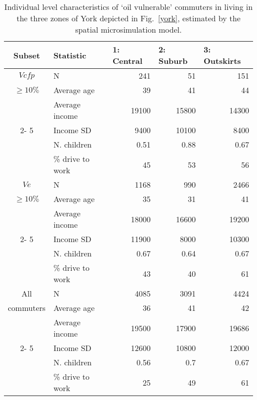 \begin{table}[htbp]
\caption[Individual level characteristics
of `oil vulnerable' commuters]{Individual level characteristics
of `oil vulnerable' commuters in living in the three zones of
York depicted in Fig.~\ref{york}, estimated by the spatial microsimulation
model.}
\begin{center}
\begin{tabular}{|c|l|r|r|r|}
\hline
Subset & Statistic & \multicolumn{1}{l|}{1: Central} & \multicolumn{1}{l|}{2:
Suburb} & \multicolumn{1}{l|}{3: Outskirts} \\ \hline
\multicolumn{ 1}{|c|}{$V{cfp}$} & N & 241 & 51 & 151 \\ \cline{ 2- 5}
\multicolumn{ 1}{|c|}{$\geq 10\%$} & Average age & 39 & 41 & 44 \\ \cline{ 2- 5}
\multicolumn{ 1}{|c|}{} & Average income & 19100 & 15800 & 14300 \\ \cline{ 2-
5}
\multicolumn{ 1}{|c|}{} & Income SD & 9400 & 10100 & 8400 \\ \cline{ 2- 5}
\multicolumn{ 1}{|c|}{} & N. children & 0.51 & 0.88 & 0.67 \\ \cline{ 2- 5}
\multicolumn{ 1}{|c|}{} & \% drive to work & 45 & 53 & 56 \\ \hline
\multicolumn{ 1}{|c|}{$V{e}$} & N & 1168 & 990 & 2466 \\ \cline{ 2- 5}
\multicolumn{ 1}{|c|}{$\geq 10\%$} & Average age & 35 & 31 & 41 \\ \cline{ 2- 5}
\multicolumn{ 1}{|c|}{} & Average income & 18000 & 16600 & 19200 \\ \cline{ 2-
5}
\multicolumn{ 1}{|c|}{} & Income SD & 11900 & 8000 & 10300 \\ \cline{ 2- 5}
\multicolumn{ 1}{|c|}{} & N. children & 0.67 & 0.64 & 0.67 \\ \cline{ 2- 5}
\multicolumn{ 1}{|c|}{} & \% drive to work & 43 & 40 & 61 \\ \hline
\multicolumn{ 1}{|c|}{All } & N & 4085 & 3091 & 4424 \\ \cline{ 2- 5}
\multicolumn{ 1}{|c|}{commuters} & Average age & 36 & 41 & 42 \\ \cline{ 2- 5}
\multicolumn{ 1}{|c|}{} & Average income & 19500 & 17900 & 19686 \\ \cline{ 2-
5}
\multicolumn{ 1}{|c|}{} & Income SD & 12600 & 10800 & 12000 \\ \cline{ 2- 5}
\multicolumn{ 1}{|c|}{} & N. children & 0.56 & 0.7 & 0.67 \\ \cline{ 2- 5}
\multicolumn{ 1}{|c|}{} & \% drive to work & 25 & 49 & 61 \\ \hline
\end{tabular}\end{center}
\label{t:ind2}
\end{table}

